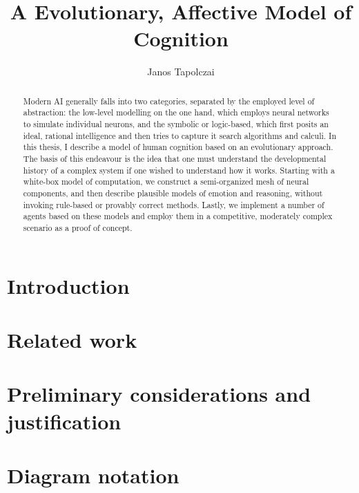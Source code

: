 \documentclass[]{scrartcl}
\title{{\huge A Evolutionary, Affective Model of Cognition}}
\author{Janos Tapolczai}
\begin{document}
\maketitle


\begin{abstract}
Modern AI generally falls into two categories, separated by the employed level of abstraction: the low-level modelling on the one hand, which employs neural networks to simulate individual neurons, and the symbolic or logic-based, which first posits an ideal, rational intelligence and then tries to capture it search algorithms and calculi. In this thesis, I describe a model of human cognition based on an evolutionary approach. The basis of this endeavour is the idea that one must understand the developmental history of a complex system if one wished to understand how it works. Starting with a white-box model of computation, we construct a semi-organized mesh of neural components, and then describe plausible models of emotion and reasoning, without invoking rule-based or provably correct methods. Lastly, we implement a number of agents based on these models and employ them in a competitive, moderately complex scenario as a proof of concept.
\end{abstract}

\newpage

\tableofcontents
\newpage

\begingroup
\let\clearpage\relax

\section{Introduction}



\section{Related work}

\section{Preliminary considerations and justification}\label{sec:preliminaries}



\section{Diagram notation}


\end{document}
